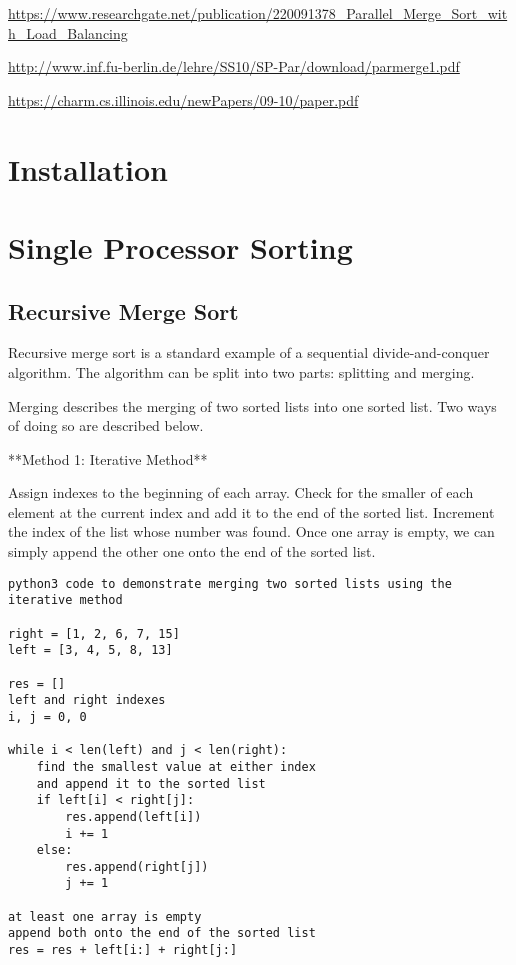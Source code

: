 \url{https://www.researchgate.net/publication/220091378_Parallel_Merge_Sort_with_Load_Balancing}

\url{http://www.inf.fu-berlin.de/lehre/SS10/SP-Par/download/parmerge1.pdf}

\url{https://charm.cs.illinois.edu/newPapers/09-10/paper.pdf}

\section{Installation}

\section{Single Processor Sorting}

\subsection{Recursive Merge Sort}

Recursive merge sort is a standard example of a sequential divide-and-conquer algorithm. The algorithm can be split into two parts:
splitting and merging.

Merging describes the merging of two sorted lists into one sorted list. Two ways of doing so are described below.

**Method 1: Iterative Method**

Assign indexes to the beginning of each array. Check for the smaller of each element at the current index and add it to
the end of the sorted list. Increment the index of the list whose number was found. Once one array is empty, we can
simply append the other one onto the end of the sorted list.

\begin{verbatim}
python3 code to demonstrate merging two sorted lists using the iterative method

right = [1, 2, 6, 7, 15]
left = [3, 4, 5, 8, 13]

res = []
left and right indexes
i, j = 0, 0

while i < len(left) and j < len(right):
    find the smallest value at either index 
    and append it to the sorted list
    if left[i] < right[j]:
        res.append(left[i])
        i += 1
    else:
        res.append(right[j])
        j += 1

at least one array is empty
append both onto the end of the sorted list
res = res + left[i:] + right[j:]
\end{verbatim}


